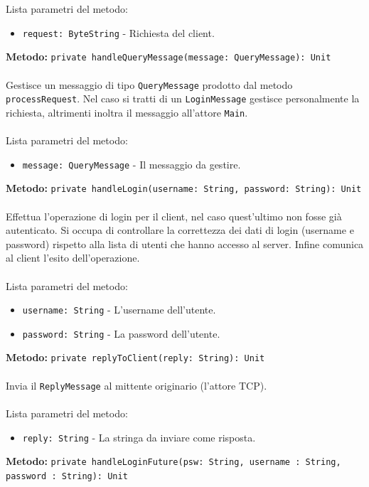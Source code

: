 \documentclass[a4paper]{article}
\begin{document}
			Lista parametri del metodo:
			\begin{itemize}
				\item \texttt{request: ByteString} - Richiesta del client.
			\end{itemize}
		\textbf{Metodo: }\texttt{private handleQueryMessage(message: QueryMessage): Unit}
			\\ \\
			Gestisce un messaggio di tipo \texttt{QueryMessage} prodotto dal metodo \texttt{processRequest}. Nel caso si tratti di un \texttt{LoginMessage} gestisce personalmente la richiesta, altrimenti inoltra il messaggio all'attore \texttt{Main}.
			\\ \\
			Lista parametri del metodo:
			\begin{itemize}
				\item \texttt{message: QueryMessage} - Il messaggio da gestire.
			\end{itemize}
		\textbf{Metodo: }\texttt{private handleLogin(username: String, password: String): Unit}
			\\ \\
			Effettua l'operazione di login per il client, nel caso quest'ultimo non fosse già autenticato. Si occupa di controllare la correttezza dei dati di login (username e password) rispetto alla lista di utenti che hanno accesso al server. Infine comunica al client l'esito dell'operazione.
			\\ \\
			Lista parametri del metodo:
			\begin{itemize}
				\item \texttt{username: String} - L'username dell'utente.
				\item \texttt{password: String} - La password dell'utente.
			\end{itemize}
		\textbf{Metodo: }\texttt{private replyToClient(reply: String): Unit}
			\\ \\
			Invia il \texttt{ReplyMessage} al mittente originario (l'attore TCP).
			\\ \\
			Lista parametri del metodo:
			\begin{itemize}
				\item \texttt{reply: String} - La stringa da inviare come risposta.
			\end{itemize}
		\textbf{Metodo: }\texttt{private handleLoginFuture(psw: String, username : String, password : String): Unit}
\end{document}
